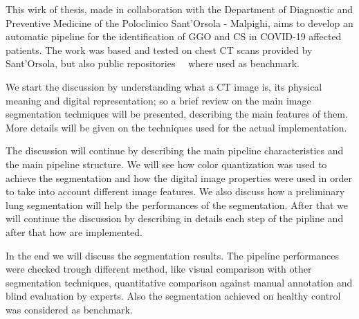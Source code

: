 \documentclass{standalone}
\begin{document}
This wirk of thesis, made in collaboration with the Department of Diagnostic and Preventive Medicine of the Poloclinico Sant'Orsola - Malpighi, aims to develop an automatic pipeline for the identification of GGO and CS in COVID-19 affected patients. The work was based and tested on chest CT scans provided by Sant'Orsola, but also public repositories~\cite{DATA:ZENODO}~\cite{DATA:MOSMED} where used as benchmark.

We start the discussion by understanding what a CT image is, its physical meaning and digital representation; so a brief review on the main image segmentation techniques will be presented, describing the main features of them. More details will be given on the techniques used for the actual implementation.

The discussion will continue by describing the main pipeline characteristics and the main pipeline structure. We will see how color quantization was used to achieve the segmentation and how the digital image properties were used in order to take into account different image features. We also discuss how a preliminary lung segmentation will help the performances of the segmentation. After that we will continue the discussion by describing in details each step of the pipline and after that how are implemented. 

In the end we will discuss the segmentation results. The pipeline performances were checked trough different method, like visual comparison with other segmentation techniques, quantitative comparison against manual annotation and blind evaluation by experts. Also the segmentation achieved on healthy control was considered as benchmark.
\end{document}
